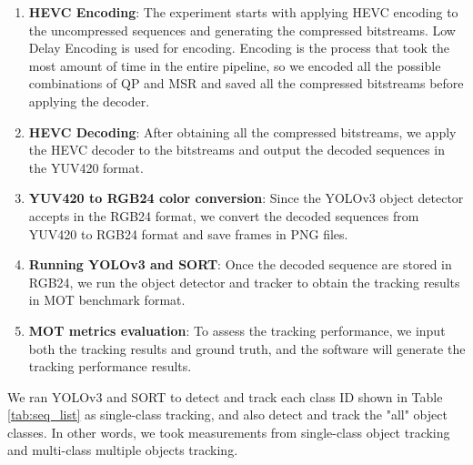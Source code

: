 \begin{enumerate}
    \item \textbf{HEVC Encoding}: The experiment starts with applying HEVC encoding to the uncompressed sequences and generating the compressed bitstreams. Low Delay Encoding is used for encoding. Encoding is the process that took the most amount of time in the entire pipeline, so we encoded all the possible combinations of QP and MSR and saved all the compressed bitstreams before applying the decoder.
    \item \textbf{HEVC Decoding}: After obtaining all the compressed bitstreams, we apply the HEVC decoder to the bitstreams and output the decoded sequences in the YUV420 format.
    \item \textbf{YUV420 to RGB24 color conversion}: Since the YOLOv3 object detector accepts in the RGB24 format, we convert the decoded sequences from YUV420 to RGB24 format and save frames in PNG files.
    \item \textbf{Running YOLOv3 and SORT}: Once the decoded sequence are stored in RGB24, we run the object detector and tracker to obtain the tracking results in MOT benchmark format. 
    \item \textbf{MOT metrics evaluation}: To assess the tracking performance, we input both the tracking results and ground truth, and the software \cite{heindl_cheindpy-motmetrics_2021} will generate the tracking performance results.
\end{enumerate}
We ran YOLOv3 and SORT to detect and track each class ID shown in Table \ref{tab:seq_list} as single-class tracking, and also detect and track the "all" object classes. In other words, we took measurements from single-class object tracking and multi-class multiple objects tracking.

